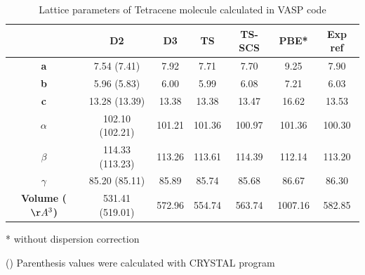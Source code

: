  \begin{table}[htb]
 	\caption{Lattice parameters of Tetracene molecule calculated in VASP code} \label{table13}
 	\begin{center}
 	\begin{threeparttable}
 		\begin{tabular}{c c c c c c c}
 			\toprule
 			 & \textbf{D2} & \textbf{D3} & \textbf{TS} & \textbf{TS-SCS} & \textbf{PBE*} & \textbf{Exp} ref\cite{campbell1962crystal} \\
 			 \midrule
 			 \textbf{a} &7.54 (7.41) &  7.92 & 7.71 & 7.70 & 9.25 & 7.90\\
 			 \textbf{b}& 5.96 (5.83) & 6.00 & 5.99 & 6.08 & 7.21 & 6.03 \\
 			 \textbf{c}& 13.28 (13.39) & 13.38 & 13.38 & 13.47 & 16.62 & 13.53 \\
 			 \textbf{$\alpha$} & 102.10 (102.21) & 101.21 & 101.36 & 100.97 & 101.36 &100.30\\
 			 \textbf{$\beta$} & 114.33 (113.23) & 113.26 & 113.61 & 114.39 & 112.14 & 113.20\\
 			 \textbf{$\gamma$} &85.20 (85.11) & 85.89 & 85.74 & 85.68 & 86.67 & 86.30\\
 			 \textbf{Volume ($\AA^{3}$)} & 531.41 (519.01) & 572.96 & 554.74 &  563.74 & 1007.16 & 582.85\\
 			 \bottomrule
 		\end{tabular} 
 		
 		\begin{tablenotes}
 			\item[*] without dispersion correction
 			\item[()] Parenthesis values were calculated with CRYSTAL program
 		\end{tablenotes}
 	\end{threeparttable}
 	\end{center}
 \end{table}
 
